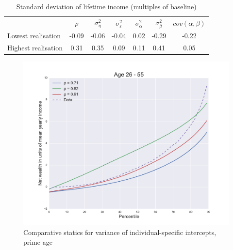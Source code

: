 \begin{table}%
\begin{tabular}{|l|cccccc}
                    & $\rho$ & $\sigma^2_{\eta}$ & $\sigma^2_{\varepsilon}$ & $\sigma^2_{\alpha}$ & $\sigma^2_{\beta}$ & $cov(\alpha,\beta)$ \\
Lowest realisation  & -0.09   &   -0.06           &   -0.04                  &     0.02            &     -0.29          &    -0.22   \\
Highest realisation &  0.31   &    0.35           &    0.09                  &     0.11            &      0.41          &     0.05   \\
\end{tabular}
\caption{Standard deviation of lifetime income (multiples of baseline)}
\label{tab:lifetime_dispersion}
\end{table}


\begin{figure}
\includegraphics[width=\columnwidth]{comp_stat_rho}
\caption{Comparative statics for variance of individual-specific intercepts, prime age}
\label{fig:comp_stat_rho}
\end{figure}

